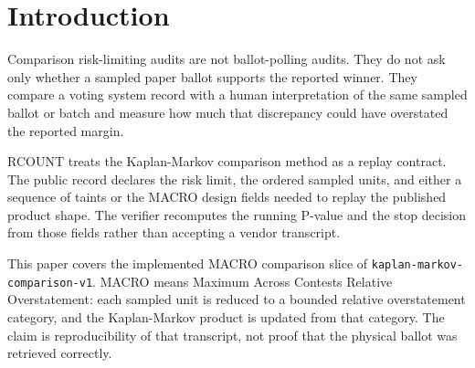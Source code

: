 \section{Introduction}

Comparison risk-limiting audits are not ballot-polling audits. They do not ask
only whether a sampled paper ballot supports the reported winner. They compare a
voting system record with a human interpretation of the same sampled ballot or
batch and measure how much that discrepancy could have overstated the reported
margin.

RCOUNT treats the Kaplan-Markov comparison method as a replay contract. The
public record declares the risk limit, the ordered sampled units, and either a
sequence of taints or the MACRO design fields needed to replay the published
product shape. The verifier recomputes the running P-value and the stop decision
from those fields rather than accepting a vendor transcript.

This paper covers the implemented MACRO comparison slice of
\texttt{kaplan-markov-comparison-v1}. MACRO means Maximum Across Contests
Relative Overstatement: each sampled unit is reduced to a bounded relative
overstatement category, and the Kaplan-Markov product is updated from that
category. The claim is reproducibility of that transcript, not proof that the
physical ballot was retrieved correctly.
